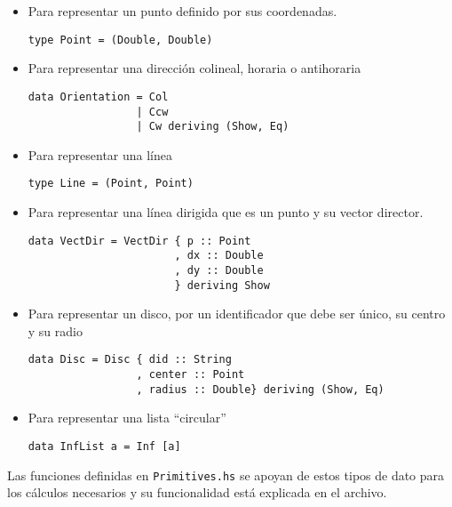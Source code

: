 \documentclass[12pt]{article}
\begin{document}
\begin{itemize}
\item Para representar un punto definido por sus coordenadas.

  \begin{verbatim}
type Point = (Double, Double)
  \end{verbatim}

\item Para representar una dirección colineal, horaria o antihoraria

  \begin{verbatim}
data Orientation = Col
                 | Ccw
                 | Cw deriving (Show, Eq)
  \end{verbatim}

\item Para representar una línea

  \begin{verbatim}
type Line = (Point, Point)  
  \end{verbatim}

\item Para representar una línea dirigida que es un punto y su vector director.

  \begin{verbatim}
data VectDir = VectDir { p :: Point
                       , dx :: Double
                       , dy :: Double
                       } deriving Show
  \end{verbatim}

\item Para representar un disco, por un identificador que debe ser único, su centro y su radio

  \begin{verbatim}
data Disc = Disc { did :: String
                 , center :: Point
                 , radius :: Double} deriving (Show, Eq)
  \end{verbatim}

\item Para representar una lista ``circular''

  \begin{verbatim}
data InfList a = Inf [a]
  \end{verbatim}
  
\end{itemize}

Las funciones definidas en \texttt{Primitives.hs} se apoyan de estos tipos de dato para los cálculos necesarios y su funcionalidad está explicada en el archivo.
\end{document}
